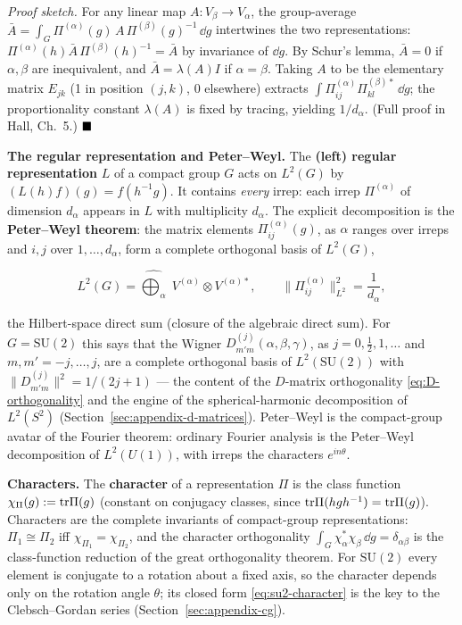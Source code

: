\emph{Proof sketch.} For any linear map $A:V_{\beta}\to V_{\alpha}$, the group-average $\bar A=\int_{G}\Pi^{(\alpha)}(g)\,A\,\Pi^{(\beta)}(g)^{-1}\,\dd g$ intertwines the two representations: $\Pi^{(\alpha)}(h)\bar A\,\Pi^{(\beta)}(h)^{-1}=\bar A$ by invariance of $\dd g$. By Schur's lemma, $\bar A=0$ if $\alpha,\beta$ are inequivalent, and $\bar A=\lambda(A)I$ if $\alpha=\beta$. Taking $A$ to be the elementary matrix $E_{jk}$ (1 in position $(j,k)$, 0 elsewhere) extracts $\int\Pi^{(\alpha)}_{ij}\Pi^{(\beta)*}_{kl}\,\dd g$; the proportionality constant $\lambda(A)$ is fixed by tracing, yielding $1/d_{\alpha}$. (Full proof in Hall, Ch.~5.) $\hfill\blacksquare$

\medskip\noindent\textbf{The regular representation and Peter--Weyl.} The \textbf{(left) regular representation} $L$ of a compact group $G$ acts on $L^{2}(G)$ by $(L(h)f)(g)=f(h^{-1}g)$. It contains \emph{every} irrep: each irrep $\Pi^{(\alpha)}$ of dimension $d_{\alpha}$ appears in $L$ with multiplicity $d_{\alpha}$. The explicit decomposition is the \textbf{Peter--Weyl theorem}: the matrix elements $\Pi^{(\alpha)}_{ij}(g)$, as $\alpha$ ranges over irreps and $i,j$ over $1,\ldots,d_{\alpha}$, form a complete orthogonal basis of $L^{2}(G)$,
\begin{linenomath}
\begin{equation}
L^{2}(G)=\widehat{\bigoplus_{\alpha}}\;V^{(\alpha)}\otimes V^{(\alpha)*},
\qquad
\|\Pi^{(\alpha)}_{ij}\|^{2}_{L^{2}}=\frac{1}{d_{\alpha}},
\label{eq:peter-weyl}
\end{equation}
\end{linenomath}
the Hilbert-space direct sum (closure of the algebraic direct sum). For $G=\mathrm{SU}(2)$ this says that the Wigner $D^{(j)}_{m'm}(\alpha,\beta,\gamma)$, as $j=0,\tfrac12,1,\ldots$ and $m,m'=-j,\ldots,j$, are a complete orthogonal basis of $L^{2}(\mathrm{SU}(2))$ with $\|D^{(j)}_{m'm}\|^{2}=1/(2j+1)$ --- the content of the $D$-matrix orthogonality \eqref{eq:D-orthogonality} and the engine of the spherical-harmonic decomposition of $L^{2}(S^{2})$ (Section~\ref{sec:appendix-d-matrices}). Peter--Weyl is the compact-group avatar of the Fourier theorem: ordinary Fourier analysis is the Peter--Weyl decomposition of $L^{2}(U(1))$, with irreps the characters $e^{in\theta}$.

\medskip\noindent\textbf{Characters.} The \textbf{character} of a representation $\Pi$ is the class function $\chi_{\Pi}(g):=\mathrm{tr}\Pi(g)$ (constant on conjugacy classes, since $\mathrm{tr}\Pi(hgh^{-1})=\mathrm{tr}\Pi(g)$). Characters are the complete invariants of compact-group representations: $\Pi_{1}\cong\Pi_{2}$ iff $\chi_{\Pi_{1}}=\chi_{\Pi_{2}}$, and the character orthogonality $\int_{G}\chi_{\alpha}^{*}\chi_{\beta}\,\dd g=\delta_{\alpha\beta}$ is the class-function reduction of the great orthogonality theorem. For $\mathrm{SU}(2)$ every element is conjugate to a rotation about a fixed axis, so the character depends only on the rotation angle $\theta$; its closed form \eqref{eq:su2-character} is the key to the Clebsch--Gordan series (Section~\ref{sec:appendix-cg}).

